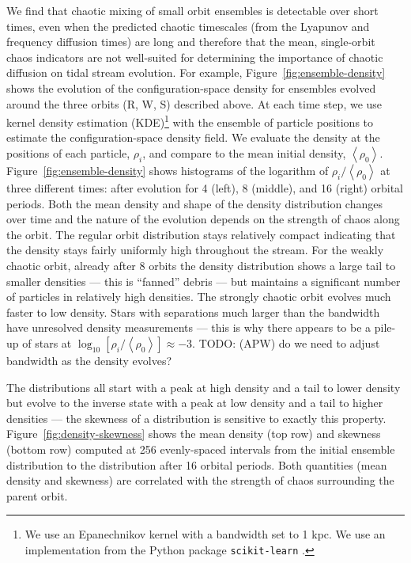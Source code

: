 \documentclass[letterpaper,12pt,preprint]{aastex}
\newcommand{\mean}[1]{\left< #1 \right>}
\newcommand{\todo}[2]{{\color{red} TODO: (\MakeUppercase{#1}) #2}}
\begin{document}
We find that chaotic mixing of small orbit ensembles is detectable over short times, even when the predicted chaotic timescales (from the Lyapunov and frequency diffusion times) are long and therefore that the mean, single-orbit chaos indicators are not well-suited for determining the importance of chaotic diffusion on tidal stream evolution. For example, Figure~\ref{fig:ensemble-density} shows the evolution of the configuration-space density for ensembles evolved around the three orbits (R, W, S) described above. At each time step, we use kernel density estimation (KDE)\footnote{We use an Epanechnikov kernel with a bandwidth set to 1 kpc. We use an implementation from the Python package \texttt{scikit-learn} \citep{scikitlearn}.} with the ensemble of particle positions to estimate the configuration-space density field. We evaluate the density at the positions of each particle, $\rho_i$, and compare to the mean initial density, $\mean{\rho_0}$. Figure~\ref{fig:ensemble-density} shows histograms of the logarithm of $\rho_i/\mean{\rho_0}$ at three different times: after evolution for 4 (left), 8 (middle), and 16 (right) orbital periods. Both the mean density and shape of the density distribution changes over time and the nature of the evolution depends on the strength of chaos along the orbit. The regular orbit distribution stays relatively compact indicating that the density stays fairly uniformly high throughout the stream. For the weakly chaotic orbit, already after 8 orbits the density distribution shows a large tail to smaller densities --- this is ``fanned'' debris --- but maintains a significant number of particles in relatively high densities. The strongly chaotic orbit evolves much faster to low density. Stars with separations much larger than the bandwidth have unresolved density measurements --- this is why there appears to be a pile-up of stars at $\log_{10}\left[\rho_i / \mean{\rho_0}\right] \approx -3$. \todo{apw}{do we need to adjust bandwidth as the density evolves?}

The distributions all start with a peak at high density and a tail to lower density but evolve to the inverse state with a peak at low density and a tail to higher densities --- the skewness of a distribution is sensitive to exactly this property. Figure~\ref{fig:density-skewness} shows the mean density (top row) and skewness (bottom row) computed at 256 evenly-spaced intervals from the initial ensemble distribution to the distribution after 16 orbital periods. Both quantities (mean density and skewness) are correlated with the strength of chaos surrounding the parent orbit. 
\end{document}
